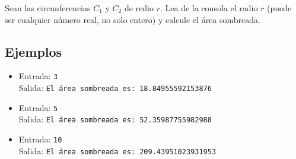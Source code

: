 Sean las circunferencias $C_1$ y $C_2$ de redio $r$. Lea de la consola el radio $r$ (puede ser cualquier número real, no solo entero) y calcule el área sombreada.

\begin{center}
\end{center}

\subsection*{Ejemplos}
\begin{itemize}
    \item Entrada: \texttt{3}\\
          Salida: \texttt{El área sombreada es: 18.84955592153876}
    \item Entrada: \texttt{5}\\
          Salida: \texttt{El área sombreada es: 52.35987755982988}
    \item Entrada: \texttt{10}\\
          Salida: \texttt{El área sombreada es: 209.43951023931953}
\end{itemize}
